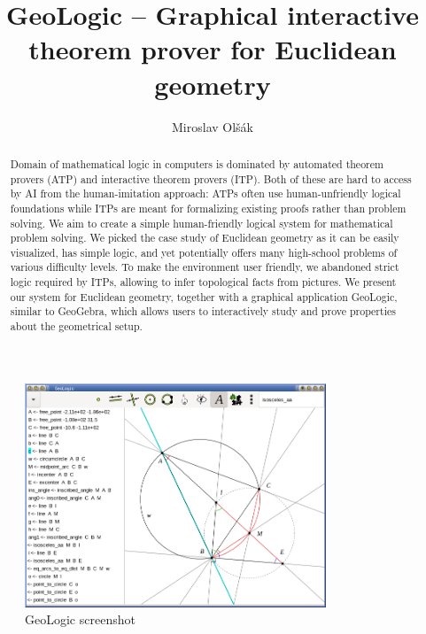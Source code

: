 \documentclass[runningheads]{llncs}
\begin{document}
\title{GeoLogic -- Graphical interactive theorem prover for Euclidean geometry}
%
%
\author{Miroslav Ol\v s\'ak}
%
%
%
\maketitle              %
%
\begin{abstract}
Domain of mathematical logic in computers is dominated by
automated theorem provers (ATP) and interactive theorem provers (ITP).
Both of these are hard to  access by AI from the human-imitation
approach: ATPs often use human-unfriendly logical foundations while ITPs
are meant for formalizing existing proofs rather than problem solving.
We aim to create a simple human-friendly logical system for mathematical
problem solving. We picked the case study of Euclidean geometry as it
can be easily visualized, has simple logic, and yet potentially offers
many high-school problems of various difficulty levels. To make the
environment user friendly, we abandoned strict logic required by ITPs,
allowing to infer topological facts from pictures. We present our system
for Euclidean geometry, together with a graphical application GeoLogic,
similar to GeoGebra, which allows users to interactively study and prove
properties about the geometrical setup.
\end{abstract}

\begin{figure}
  \centering
  \includegraphics[width = 9cm]{screenshot.png}%
  \caption{GeoLogic screenshot}
\end{figure}
\end{document}
